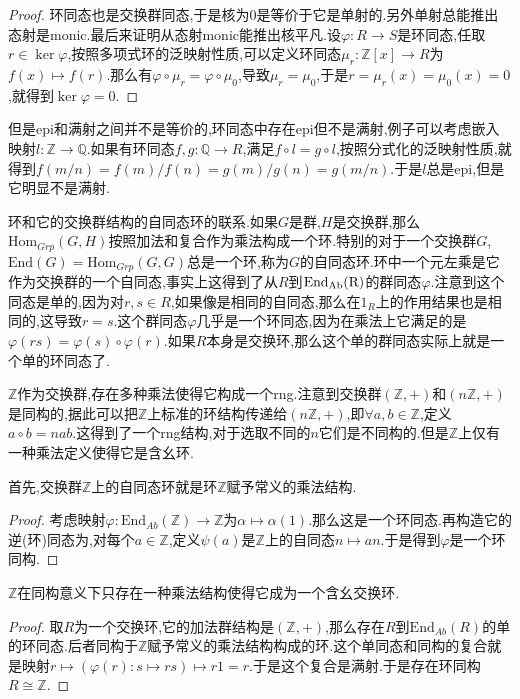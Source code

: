 \begin{enumerate}
\begin{proof}
		环同态也是交换群同态,于是核为${0}$是等价于它是单射的.另外单射总能推出态射是monic.最后来证明从态射monic能推出核平凡.设$\varphi:R\to S$是环同态,任取$r\in\ker\varphi$,按照多项式环的泛映射性质,可以定义环同态$\mu_r:\mathbb{Z}[x]\to R$为$f(x)\mapsto f(r)$.那么有$\varphi\circ\mu_r=\varphi\circ\mu_0$,导致$\mu_r=\mu_0$,于是$r=\mu_r(x)=\mu_0(x)=0$,就得到$\ker\varphi={0}$.
	\end{proof}
	
	但是epi和满射之间并不是等价的,环同态中存在epi但不是满射,例子可以考虑嵌入映射$l:\mathbb{Z}\to\mathbb{Q}$.如果有环同态$f,g:\mathbb{Q}\to R$,满足$f\circ l=g\circ l$,按照分式化的泛映射性质,就得到$f(m/n)=f(m)/f(n)=g(m)/g(n)=g(m/n)$.于是$l$总是epi,但是它明显不是满射.
\end{enumerate}

环和它的交换群结构的自同态环的联系.如果$G$是群,$H$是交换群,那么$\mathrm{Hom}_{Grp}(G,H)$按照加法和复合作为乘法构成一个环.特别的对于一个交换群$G$,$\mathrm{End}(G)=\mathrm{Hom}_{Grp}(G,G)$总是一个环,称为$G$的自同态环.环中一个元左乘是它作为交换群的一个自同态,事实上这得到了从$R$到$\rm{End}_{Ab}(R)$的群同态$\varphi$.注意到这个同态是单的,因为对$r,s\in R$,如果像是相同的自同态,那么在$1_R$上的作用结果也是相同的,这导致$r=s$.这个群同态$\varphi$几乎是一个环同态,因为在乘法上它满足的是$\varphi(rs)=\varphi(s)\circ\varphi(r)$.如果$R$本身是交换环,那么这个单的群同态实际上就是一个单的环同态了.

$\mathbb{Z}$作为交换群,存在多种乘法使得它构成一个rng.注意到交换群$(\mathbb{Z},+)$和$(n\mathbb{Z},+)$是同构的,据此可以把$\mathbb{Z}$上标准的环结构传递给$(n\mathbb{Z},+)$,即$\forall a,b\in \mathbb{Z}$,定义$a\circ b=nab$.这得到了一个rng结构,对于选取不同的$n$它们是不同构的.但是$\mathbb{Z}$上仅有一种乘法定义使得它是含幺环.

首先,交换群$\mathbb{Z}$上的自同态环就是环$\mathbb{Z}$赋予常义的乘法结构.
\begin{proof}
	
	考虑映射$\varphi:\mathrm{End}_{Ab}(\mathbb{Z})\to\mathbb{Z}$为$\alpha\mapsto\alpha(1)$.那么这是一个环同态.再构造它的逆(环)同态为,对每个$a\in\mathbb{Z}$,定义$\psi(a)$是$\mathbb{Z}$上的自同态$n\mapsto an$.于是得到$\varphi$是一个环同构.
\end{proof}

$\mathbb{Z}$在同构意义下只存在一种乘法结构使得它成为一个含幺交换环.
\begin{proof}
	
	取$R$为一个交换环,它的加法群结构是$(\mathbb{Z},+)$,那么存在$R$到$\mathrm{End}_{Ab}(R)$的单的环同态.后者同构于$\mathbb{Z}$赋予常义的乘法结构构成的环.这个单同态和同构的复合就是映射$r\mapsto\left(\varphi(r):s\mapsto rs\right)\mapsto r1=r$.于是这个复合是满射.于是存在环同构$R\cong\mathbb{Z}$.
\end{proof}

